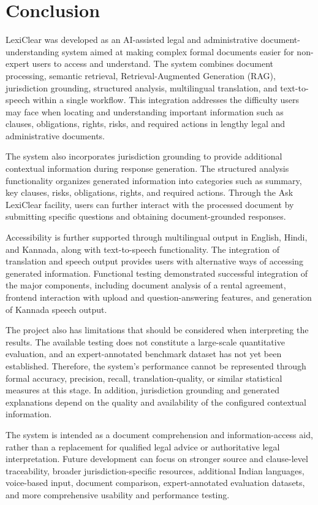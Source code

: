 \documentclass[12pt,a4paper,oneside]{report}
\begin{document}
\chapter{Conclusion}

LexiClear was developed as an AI-assisted legal and administrative document-understanding system aimed at making complex formal documents easier for non-expert users to access and understand. The system combines document processing, semantic retrieval, Retrieval-Augmented Generation (RAG), jurisdiction grounding, structured analysis, multilingual translation, and text-to-speech within a single workflow. This integration addresses the difficulty users may face when locating and understanding important information such as clauses, obligations, rights, risks, and required actions in lengthy legal and administrative documents.


The system also incorporates jurisdiction grounding to provide additional contextual information during response generation. The structured analysis functionality organizes generated information into categories such as summary, key clauses, risks, obligations, rights, and required actions. Through the Ask LexiClear facility, users can further interact with the processed document by submitting specific questions and obtaining document-grounded responses.

Accessibility is further supported through multilingual output in English, Hindi, and Kannada, along with text-to-speech functionality. The integration of translation and speech output provides users with alternative ways of accessing generated information. Functional testing demonstrated successful integration of the major components, including document analysis of a rental agreement, frontend interaction with upload and question-answering features, and generation of Kannada speech output.

The project also has limitations that should be considered when interpreting the results. The available testing does not constitute a large-scale quantitative evaluation, and an expert-annotated benchmark dataset has not yet been established. Therefore, the system's performance cannot be represented through formal accuracy, precision, recall, translation-quality, or similar statistical measures at this stage. In addition, jurisdiction grounding and generated explanations depend on the quality and availability of the configured contextual information.

The system is intended as a document comprehension and information-access aid, rather than a replacement for qualified legal advice or authoritative legal interpretation. Future development can focus on stronger source and clause-level traceability, broader jurisdiction-specific resources, additional Indian languages, voice-based input, document comparison, expert-annotated evaluation datasets, and more comprehensive usability and performance testing.
\end{document}
